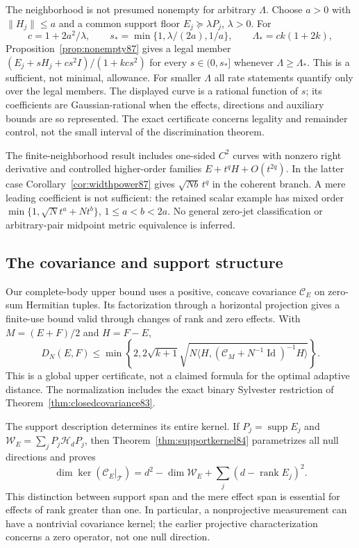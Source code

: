 The neighborhood is not presumed nonempty for arbitrary $\Lambda$.
Choose $a>0$ with $\|H_j\|\le a$ and a common support floor
$E_j\succeq\lambda P_j$, $\lambda>0$.  For
\[
 c=1+2a^2/\lambda,\qquad
 s_* =\min\{1,\lambda/(2a),1/a\},\qquad
 \Lambda_*=ck(1+2k),
\]
Proposition~\ref{prop:nonempty87} gives a legal member
$(E_j+sH_j+cs^2I)/(1+kcs^2)$ for every $s\in(0,s_*]$
whenever $\Lambda\ge\Lambda_*$.  This is a sufficient, not
minimal, allowance.  For smaller $\Lambda$ all rate statements
quantify only over the legal members.  The displayed curve is a
rational function of $s$; its coefficients are Gaussian-rational
when the effects, directions and auxiliary bounds are so represented.
The exact certificate concerns legality and remainder control,
not the small interval of the discrimination theorem.

The finite-neighborhood result includes one-sided $C^2$ curves with
nonzero right derivative and controlled higher-order families
$E+t^qH+O(t^{2q})$.  In the latter case
Corollary~\ref{cor:widthpower87} gives $\sqrt{Nb}\,t^q$
in the coherent branch.  A mere leading coefficient is not sufficient:
the retained scalar example has mixed order
$\min\{1,\sqrt N t^a+Nt^b\}$, $1\le a<b<2a$.
No general zero-jet classification or arbitrary-pair midpoint
metric equivalence is inferred.

\subsection{The covariance and support structure}
Our complete-body upper bound uses a positive, concave covariance
$\mathcal C_E$ on zero-sum Hermitian tuples.  Its factorization through
a horizontal projection gives a finite-use bound valid through changes
of rank and zero effects.  With $M=(E+F)/2$ and $H=F-E$,
\begin{equation}\label{eq:frontupper84}
 D_N(E,F)\le\min\left\{2,2\sqrt{k+1}
  \sqrt{N\langle H,(\mathcal C_M+N^{-1}\operatorname{Id})^{-1}H\rangle}
                              \right\}.
\end{equation}
This is a global upper certificate, not a claimed formula for the
optimal adaptive distance.  The normalization includes the exact
binary Sylvester restriction of Theorem~\ref{thm:closedcovariance83}.

The support description determines its entire kernel.  If
$P_j=\operatorname{supp}E_j$ and
$\mathcal W_E=\sum_jP_j\mathcal H_dP_j$, then
Theorem~\ref{thm:supportkernel84} parametrizes all null directions
and proves
\[
 \dim\ker(\mathcal C_E|_{\mathcal T})
 =d^2-\dim\mathcal W_E+\sum_j(d-\operatorname{rank}E_j)^2.
\]
This distinction between support span and the mere effect span is
essential for effects of rank greater than one.  In particular,
a nonprojective measurement can have a nontrivial covariance kernel;
the earlier projective characterization concerns a zero operator,
not one null direction.

